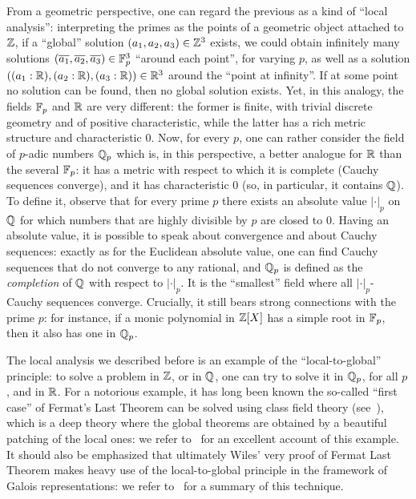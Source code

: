 \documentclass[sigplan,10pt,anonymous,review]{acmart}
\begin{document}
From a geometric perspective, one can regard the previous as a kind of ``local analysis'': interpreting the primes as the points of a geometric object attached to $\mathbb{Z}$, if a ``global'' solution $(a_1,a_2,a_3)\in\mathbb{Z}^3$ exists, we could obtain infinitely many solutions $(\overline{a_1},\overline{a_2},\overline{a_3})\in\mathbb{F}_{p}^3$ ``around each point'', for varying $p$, as well as a solution $((a_1 : \mathbb{R}),(a_2 : \mathbb{R}),(a_3 : \mathbb{R}))\in\mathbb{R}^3$ around the ``point at infinity''. If at some point no solution can be found, then no global solution exists. Yet, in this analogy, the fields $\mathbb{F}_{p}$ and $\mathbb{R}$ are very different: the former is finite, with trivial discrete geometry and of positive characteristic, while the latter has a rich metric structure and characteristic $0$. Now, for every $p$, one can rather consider the field of $p$-adic numbers $\mathbb{Q}_p$ which is, in this perspective, a better analogue for $\mathbb{R}$ than the several $\mathbb{F}_{p}$: it has a metric with respect to which it is complete (Cauchy sequences converge), and it has characteristic $0$ (so, in particular, it contains $\mathbb{Q}$). To define it, observe that for every prime $p$ there exists an absolute value $\lvert\cdot\rvert_p$ on $\mathbb{Q}$
for which numbers that are highly divisible by $p$ are closed to $0$. Having an absolute value, it is possible to speak about convergence and about Cauchy sequences: exactly as for the Euclidean absolute value, one can find Cauchy sequences that do not converge to any rational, and $\mathbb{Q}_p$ is defined as the \emph{completion} of $\mathbb{Q}$ with respect to $\lvert\cdot\rvert_p$. It is the ``smallest'' field where all $\lvert\cdot\rvert_p$-Cauchy sequences converge. Crucially, it still bears strong connections with the prime $p$: for instance, if a monic polynomial in $\mathbb{Z}[X]$ has a simple root in $\mathbb{F}_{p}$, then it also has one in $\mathbb{Q}_p$. 

The local analysis we described before is an example of the ``local-to-global'' principle: to solve a problem in $\mathbb{Z}$, or in $\mathbb{Q}$, one can try to solve it in $\mathbb{Q}_p$, for all $p$, and in $\mathbb{R}$. For a notorious example, it has long been known 
the so-called ``first case'' of Fermat's Last Theorem can be solved using class field theory (see~\cite{LenSte97}), which is a deep theory where the global theorems are obtained by a beautiful patching of the local ones: we refer to \cite{Tat67}~for an excellent account of this example. It should also be emphasized that ultimately Wiles' very proof of Fermat Last Theorem makes heavy use of the local-to-global principle in the 
framework of Galois representations: we refer to~\cite{Fre09} for a summary of this technique.
\end{document}

